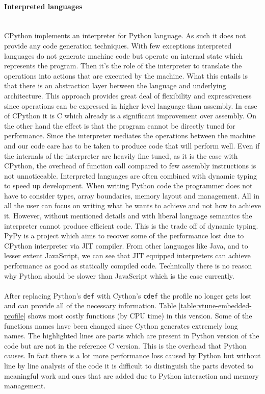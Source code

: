 \documentclass[12pt, a4paper]{report}
\newcommand{\myparagraph}[1]{\paragraph{#1}\mbox{}\\}
\begin{document}
\myparagraph{Interpreted languages}\label{para:interpret-lang}
CPython implements an interpreter for Python language. As such it does not provide
any code generation techniques. With few exceptions interpreted languages do not
generate machine code but operate on internal state which represents the program.
Then it's the role of the interpreter to translate the operations into actions
that are executed by the machine. What this entails is that there is an
abstraction layer between the language and underlying architecture. This
approach provides great deal of flexibility and expressiveness since operations
can be expressed in higher level language than assembly. In case of CPython it
is C which already is a significant improvement over assembly. On the other hand
the effect is that the program cannot be directly tuned for performance. Since
the interpreter mediates the operations between the machine and our code care
has to be taken to produce code that will perform well. Even if the internals
of the interpreter are heavily fine tuned, as it is the case with CPython, the
overhead of function call compared to few assembly instructions is not unnoticeable.
Interpreted languages are often combined with dynamic typing to speed up development.
When writing Python code the programmer does not have to consider types,
array boundaries, memory layout and management. All in all the user can focus
on writing what he wants to achieve and not how to achieve it. However, without
mentioned details and with liberal language semantics the interpreter cannot
produce efficient code. This is the trade off of dynamic typing. PyPy is a
project which aims to recover some of the performance lost due to CPython
interpreter via JIT compiler. From other languages like Java, and to lesser
extent JavaScript, we can see that JIT equipped interpreters can achieve performance
as good as statically compiled code. Technically there is no reason why Python
should be slower than JavaScript which is the case currently.
\\\\
After replacing Python's \lstinline{def} with Cython's \lstinline{cdef} the profile
no longer gets lost and can provide all of the necessary information. Table
\ref{table:vtune-embedded-profile} shows most costly functions (by CPU time)
in this version. Some of the functions names have been changed since Cython
generates extremely long names. The highlighted lines are parts which are
present in Python version of the code but are not in the reference C version.
This is the overhead that Python causes. In fact there is a lot more performance
loss caused by Python but without line by line analysis of the code it is
difficult to distinguish the parts devoted to meaningful work and ones that
are added due to Python interaction and memory management.
\end{document}
